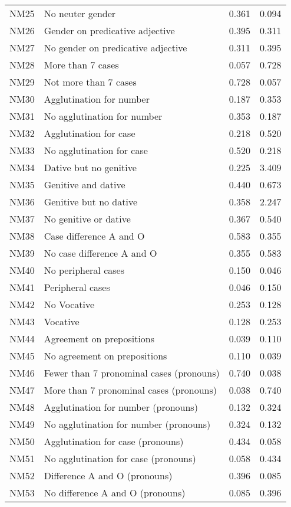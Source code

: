 \begin{longtable}{llll}
NM25 & No neuter gender & 0.361 & 0.094\\
NM26 & Gender on predicative adjective & 0.395 & 0.311\\
NM27 & No gender on predicative adjective & 0.311 & 0.395\\
NM28 & More than 7 cases & 0.057 & 0.728\\
NM29 & Not more than 7 cases & 0.728 & 0.057\\
NM30 & Agglutination for number & 0.187 & 0.353\\
NM31 & No agglutination for number & 0.353 & 0.187\\
NM32 & Agglutination for case & 0.218 & 0.520\\
NM33 & No agglutination for case & 0.520 & 0.218\\
NM34 & Dative but no genitive & 0.225 & 3.409\\
NM35 & Genitive and dative & 0.440 & 0.673\\
NM36 & Genitive but no dative & 0.358 & 2.247\\
NM37 & No genitive or dative & 0.367 & 0.540\\
NM38 & Case difference A and O & 0.583 & 0.355\\
NM39 & No case difference A and O & 0.355 & 0.583\\
NM40 & No peripheral cases & 0.150 & 0.046\\
NM41 & Peripheral cases & 0.046 & 0.150\\
NM42 & No Vocative & 0.253 & 0.128\\
NM43 & Vocative & 0.128 & 0.253\\
NM44 & Agreement on prepositions & 0.039 & 0.110\\
NM45 & No agreement on prepositions & 0.110 & 0.039\\
NM46 & Fewer than 7 pronominal cases (pronouns) & 0.740 & 0.038\\
NM47 & More than 7 pronominal cases (pronouns) & 0.038 & 0.740\\
NM48 & Agglutination for number (pronouns) & 0.132 & 0.324\\
NM49 & No agglutination for number (pronouns) & 0.324 & 0.132\\
NM50 & Agglutination for case (pronouns) & 0.434 & 0.058\\
NM51 & No agglutination for case (pronouns) & 0.058 & 0.434\\
NM52 & Difference A and O (pronouns) & 0.396 & 0.085\\
NM53 & No difference A and O (pronouns) & 0.085 & 0.396\\

\end{longtable}
